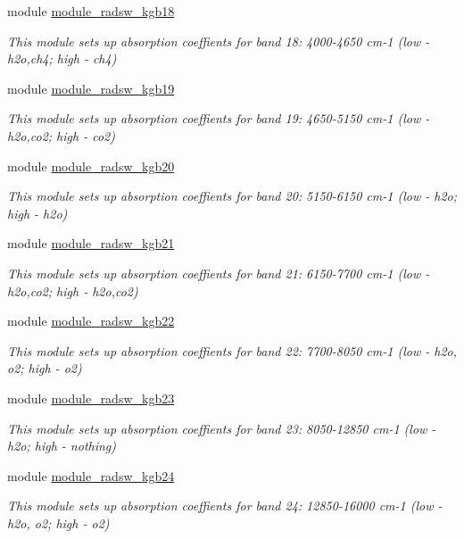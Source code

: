 \begin{DoxyCompactItemize}
module \hyperlink{namespacemodule__radsw__kgb18}{module\+\_\+radsw\+\_\+kgb18}
\begin{DoxyCompactList}\small\item\em This module sets up absorption coeffients for band 18\+: 4000-\/4650 cm-\/1 (low -\/ h2o,ch4; high -\/ ch4) \end{DoxyCompactList}\item 
module \hyperlink{namespacemodule__radsw__kgb19}{module\+\_\+radsw\+\_\+kgb19}
\begin{DoxyCompactList}\small\item\em This module sets up absorption coeffients for band 19\+: 4650-\/5150 cm-\/1 (low -\/ h2o,co2; high -\/ co2) \end{DoxyCompactList}\item 
module \hyperlink{namespacemodule__radsw__kgb20}{module\+\_\+radsw\+\_\+kgb20}
\begin{DoxyCompactList}\small\item\em This module sets up absorption coeffients for band 20\+: 5150-\/6150 cm-\/1 (low -\/ h2o; high -\/ h2o) \end{DoxyCompactList}\item 
module \hyperlink{namespacemodule__radsw__kgb21}{module\+\_\+radsw\+\_\+kgb21}
\begin{DoxyCompactList}\small\item\em This module sets up absorption coeffients for band 21\+: 6150-\/7700 cm-\/1 (low -\/ h2o,co2; high -\/ h2o,co2) \end{DoxyCompactList}\item 
module \hyperlink{namespacemodule__radsw__kgb22}{module\+\_\+radsw\+\_\+kgb22}
\begin{DoxyCompactList}\small\item\em This module sets up absorption coeffients for band 22\+: 7700-\/8050 cm-\/1 (low -\/ h2o, o2; high -\/ o2) \end{DoxyCompactList}\item 
module \hyperlink{namespacemodule__radsw__kgb23}{module\+\_\+radsw\+\_\+kgb23}
\begin{DoxyCompactList}\small\item\em This module sets up absorption coeffients for band 23\+: 8050-\/12850 cm-\/1 (low -\/ h2o; high -\/ nothing) \end{DoxyCompactList}\item 
module \hyperlink{namespacemodule__radsw__kgb24}{module\+\_\+radsw\+\_\+kgb24}
\begin{DoxyCompactList}\small\item\em This module sets up absorption coeffients for band 24\+: 12850-\/16000 cm-\/1 (low -\/ h2o, o2; high -\/ o2) \end{DoxyCompactList}\item 

\end{DoxyCompactItemize}
